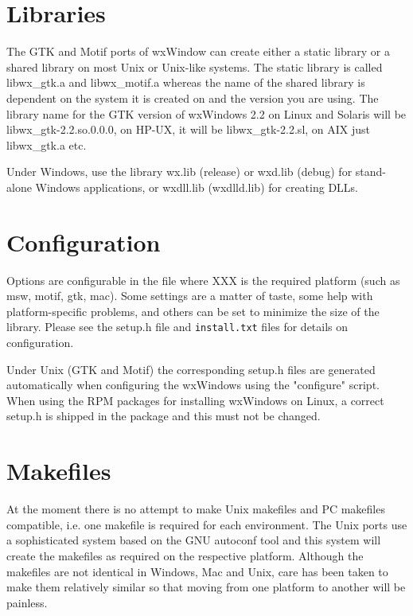 \section{Libraries}

The GTK and Motif ports of wxWindow can create either a static library or a shared
library on most Unix or Unix-like systems. The static library is called libwx\_gtk.a
and libwx\_motif.a whereas the name of the shared library is dependent on the
system it is created on and the version you are using. The library name for the
GTK version of wxWindows 2.2 on Linux and Solaris will be libwx\_gtk-2.2.so.0.0.0,
on HP-UX, it will be libwx\_gtk-2.2.sl, on AIX just libwx\_gtk.a etc.

Under Windows, use the library wx.lib (release) or wxd.lib (debug) for stand-alone Windows
applications, or wxdll.lib (wxdlld.lib) for creating DLLs.

\section{Configuration}

Options are configurable in the file
 where XXX is the required platform (such as msw, motif, gtk, mac). Some 
settings are a matter of taste, some help with platform-specific problems, and
others can be set to minimize the size of the library. Please see the setup.h file
and {\tt install.txt} files for details on configuration.

Under Unix (GTK and Motif) the corresponding setup.h files are generated automatically
when configuring the wxWindows using the "configure" script. When using the RPM packages
for installing wxWindows on Linux, a correct setup.h is shipped in the package and
this must not be changed.

\section{Makefiles}

At the moment there is no attempt to make Unix makefiles and
PC makefiles compatible, i.e. one makefile is required for
each environment. The Unix ports use a sophisticated system based
on the GNU autoconf tool and this system will create the
makefiles as required on the respective platform. Although the
makefiles are not identical in Windows, Mac and Unix, care has
been taken to make them relatively similar so that moving from
one platform to another will be painless.

